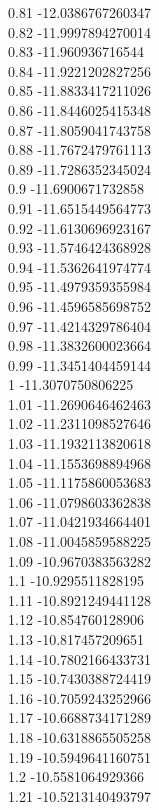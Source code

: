 {0.81	-12.0386767260347\\
0.82	-11.9997894270014\\
0.83	-11.960936716544\\
0.84	-11.9221202827256\\
0.85	-11.8833417211026\\
0.86	-11.8446025415348\\
0.87	-11.8059041743758\\
0.88	-11.7672479761113\\
0.89	-11.7286352345024\\
0.9	-11.6900671732858\\
0.91	-11.6515449564773\\
0.92	-11.6130696923167\\
0.93	-11.5746424368928\\
0.94	-11.5362641974774\\
0.95	-11.4979359355984\\
0.96	-11.4596585698752\\
0.97	-11.4214329786404\\
0.98	-11.3832600023664\\
0.99	-11.3451404459144\\
1	-11.3070750806225\\
1.01	-11.2690646462463\\
1.02	-11.2311098527646\\
1.03	-11.1932113820618\\
1.04	-11.1553698894968\\
1.05	-11.1175860053683\\
1.06	-11.0798603362838\\
1.07	-11.0421934664401\\
1.08	-11.0045859588225\\
1.09	-10.9670383563282\\
1.1	-10.9295511828195\\
1.11	-10.8921249441128\\
1.12	-10.854760128906\\
1.13	-10.817457209651\\
1.14	-10.7802166433731\\
1.15	-10.7430388724419\\
1.16	-10.7059243252966\\
1.17	-10.6688734171289\\
1.18	-10.6318865505258\\
1.19	-10.5949641160751\\
1.2	-10.5581064929366\\
1.21	-10.5213140493797\\
}
